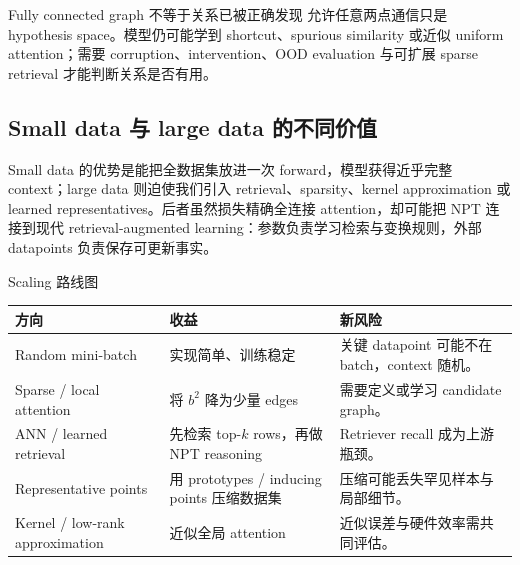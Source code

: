 \documentclass[a4paper]{article}
\begin{document}

\begin{warningbox}{Fully connected graph 不等于关系已被正确发现}
允许任意两点通信只是 hypothesis space。模型仍可能学到 shortcut、spurious similarity 或近似 uniform attention；需要 corruption、intervention、OOD evaluation 与可扩展 sparse retrieval 才能判断关系是否有用。
\end{warningbox}

\subsection{Small data 与 large data 的不同价值}

Small data 的优势是能把全数据集放进一次 forward，模型获得近乎完整 context；large data 则迫使我们引入 retrieval、sparsity、kernel approximation 或 learned representatives。后者虽然损失精确全连接 attention，却可能把 NPT 连接到现代 retrieval-augmented learning：参数负责学习检索与变换规则，外部 datapoints 负责保存可更新事实。


\begin{knowledgebox}{Scaling 路线图}
\begin{tabularx}{\textwidth}{L{0.24\textwidth}>{\raggedright\arraybackslash}X >{\raggedright\arraybackslash}X}
\toprule
方向 & 收益 & 新风险 \\
\midrule
Random mini-batch & 实现简单、训练稳定 & 关键 datapoint 可能不在 batch，context 随机。 \\
Sparse / local attention & 将 $b^2$ 降为少量 edges & 需要定义或学习 candidate graph。 \\
ANN / learned retrieval & 先检索 top-$k$ rows，再做 NPT reasoning & Retriever recall 成为上游瓶颈。 \\
Representative points & 用 prototypes / inducing points 压缩数据集 & 压缩可能丢失罕见样本与局部细节。 \\
Kernel / low-rank approximation & 近似全局 attention & 近似误差与硬件效率需共同评估。 \\
\bottomrule
\end{tabularx}
\end{knowledgebox}
\end{document}
